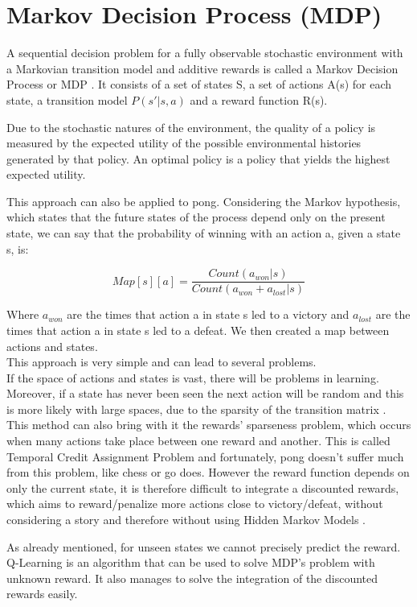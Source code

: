 \section{Markov Decision Process (MDP)}

A sequential decision problem for a fully observable stochastic environment with a Markovian transition model and additive rewards is called a Markov Decision Process or MDP \cite{russell2002artificial}.
It consists of a set of states S, a set of actions A(s) for each state, a transition model
$P(s' | s, a)$ and a reward function R(s).

Due to the stochastic natures of the environment, the quality of a policy is measured by the expected utility of the possible environmental histories generated by that policy. An optimal policy is a policy that yields the highest expected utility.

This approach can also be applied to pong.
Considering the Markov hypothesis, which states that the future states of the process depend only on the present state, we can say that the probability of winning with an action a, given a state s, is:

\[ { Map[s][a] = \frac{ Count(a_{won} | s) }{ Count(a_{won} + a_{lost} | s) } } \]

Where $a_{won}$ are the times that action a in state s led to a victory and
$a_{lost}$ are the times that action a in state s led to a defeat.
We then created a map between actions and states. \\

This approach is very simple and can lead to several problems. \\
If the space of actions and states is vast, there will be problems in learning.
Moreover, if a state has never been seen the next action will be random and this is more
likely with large spaces, due to the sparsity of the transition matrix \cite{silver2015}.
This method can also bring with it the rewards' sparseness problem, which occurs when many
actions take place between one reward and another. This is called Temporal Credit Assignment Problem \cite{sutton1984temporal}
and fortunately, pong doesn't suffer much from this problem, like chess or go does.
However the reward function depends on only the current state, it is
therefore difficult to integrate a discounted rewards, which aims to reward/penalize
more actions close to victory/defeat, without considering a story and therefore
without using Hidden Markov Models \cite{silver2015}.

As already mentioned, for unseen states we cannot precisely predict the reward.
Q-Learning is an algorithm that can be used to solve MDP's problem with unknown reward.
It also manages to solve the integration of the discounted rewards easily.
